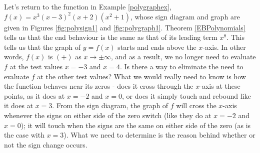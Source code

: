 
Let's return to the function in Example \ref{polygraphex}, $f(x) = x^3 (x-3)^2 (x+2)\left(x^2+1\right)$, whose sign diagram and graph are given in Figures \ref{fig:polysign1} and \ref{fig:polygraph1}.  Theorem \ref{EBPolynomials} tells us that the end behaviour is the same as that of its leading term $x^{8}$.  This tells us that the graph of $y=f(x)$ starts and ends above the $x$-axis.  In other words, $f(x)$ is $(+)$ as $x \rightarrow \pm \infty$, and as a result, we no longer need to evaluate $f$ at the test values $x=-3$ and $x=4$.  Is there a way to eliminate the need to evaluate $f$ at the other test values?  What we would really need to know is how the function behaves near its zeros - does it cross through the $x$-axis at these points, as it does at $x=-2$ and $x=0$, or does it simply touch and rebound like it does at $x=3$.  From the sign diagram, the graph of $f$ will cross the $x$-axis whenever the signs on either side of the zero switch (like they do at $x=-2$ and $x=0$);  it will touch when the signs are the same on either side of the zero (as is the case with $x=3$). What we need to determine is the reason behind whether or not the sign change occurs.


